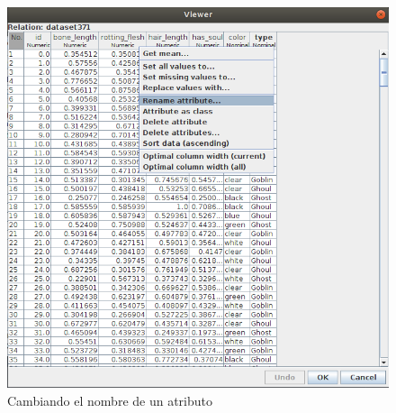 \documentclass[11pt,twoside,a4paper]{book}
\begin{document}
\begin{figure}[H]
   \includegraphics[width=\textwidth]{ejercicio4_3.png}
	\caption{Cambiando el nombre de un atributo}
	\label{Fig8}
\end{figure}
\end{document}
